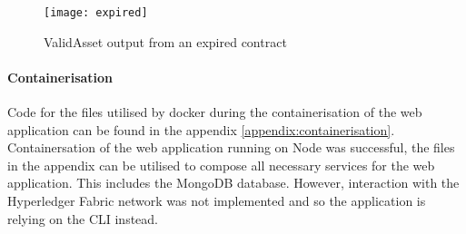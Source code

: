 \begin{figure}[H]
  \texttt{[image: expired]}
  \caption{ValidAsset output from an expired contract}
  \label{fig:expired}
\end{figure}

\paragraph{Containerisation}
Code for the files utilised by docker during the containerisation of the web application can be found in the appendix \ref{appendix:containerisation}.
Containersation of the web application running on Node was successful, the files in the appendix can be utilised to compose all necessary services for the web application. 
This includes the MongoDB database. 
However, interaction with the Hyperledger Fabric network was not implemented and so the application is relying on the CLI instead. 
